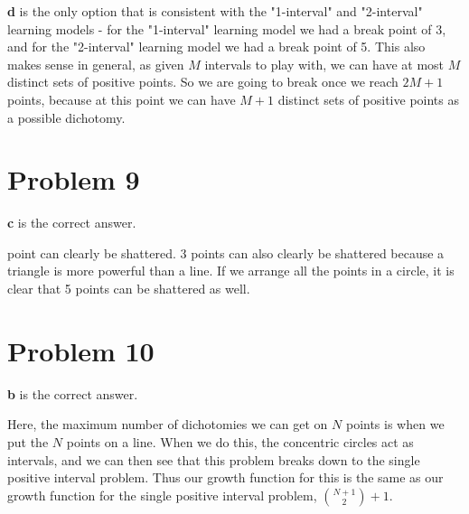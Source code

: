 \documentclass{article}
\begin{document}
\noindent \textbf{d} is the only option that is consistent with the "1-interval"
and "2-interval" learning models - for the "1-interval" learning model we had
a break point of 3, and for the "2-interval" learning model we had a break point
of 5. This also makes sense in general, as given $M$ intervals to play with,
we can have at most $M$ distinct sets of positive points. So we are going to break
once we reach $2M + 1$ points, because at this point we can have $M+1$ distinct
sets of positive points as a possible dichotomy.
\section*{Problem 9}
\textbf{c} is the correct answer.

 point can clearly be shattered. 3 points can also clearly be
shattered because a triangle is more powerful than a line. If we arrange all
the points in a circle, it is clear that 5 points can be shattered as well.

\section*{Problem 10}
\textbf{b} is the correct answer.

\noindent Here, the maximum number of dichotomies we can get on $N$ points
is when we put the $N$ points on a line. When we do this, the concentric circles
act as intervals, and we can then see that this problem breaks down to
the single positive interval problem. Thus our growth function for this is
the same as our growth function for the single positive interval problem,
$\binom{N+1}{2} + 1$.
\end{document}
